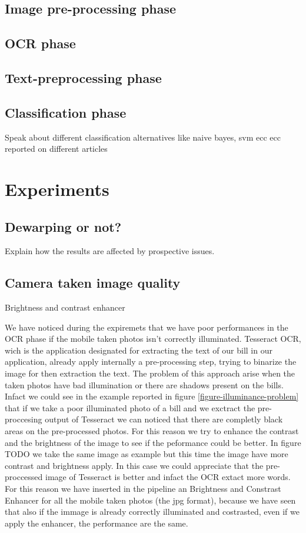\documentclass[10pt,twocolumn,letterpaper]{article}
\begin{document}
\subsection{Image pre-processing phase}

\subsection{OCR phase}

\subsection{Text-preprocessing phase}

\subsection{Classification phase}
Speak about different classification alternatives like naive bayes, svm ecc ecc reported on different  articles




\section{Experiments}

\subsection{Dewarping or not?}
Explain how the results are affected by prospective issues.

\subsection{Camera taken image quality}
Brightness and contrast enhancer 

We have noticed during the expiremets that we have poor performances in the OCR phase if the mobile taken photos isn't correctly illuminated. Tesseract OCR, wich is the application designated for extracting the text of our bill in our application, already apply internally a pre-processing step, trying to binarize the image for then extraction the text. The problem of this approach arise when the taken photos have bad illumination or there are shadows present on the bills. Infact we could see in the example reported in figure \ref{figure-illuminance-problem} that if we take a poor illuminated photo of a bill and we exctract the pre-proccesing output of Tesseract we can noticed that there are completly black areas on the pre-processed photos. For this reason we try to enhance the contrast and the brightness of the image to see if the peformance could be better. In figure TODO we take the same image as example but this time the image have more contrast and brightness apply. In this case we could appreciate that the pre-proccessed image of Tesseract is better and infact the OCR extact more words. For this reason we have inserted in the pipeline an Brightness and Constrast Enhancer for all the mobile taken photos (the jpg format), because we have seen that also if the immage is already correctly illuminated and costrasted, even if we apply the enhancer, the performance are the same.
\end{document}
